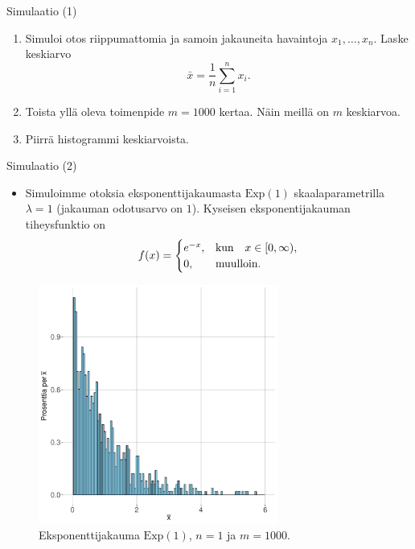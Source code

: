 \documentclass{beamer}
\begin{document}

\begin{frame}{Simulaatio (1)}
  \begin{enumerate}
    \item Simuloi otos riippumattomia ja samoin jakauneita havaintoja $x_1,
    \ldots, x_n$. Laske keskiarvo
    \begin{equation*}
      \bar x = \frac{1}{n}\sum_{i=1}^n x_i.
    \end{equation*}
    \pause
    \item Toista yllä oleva toimenpide $m = 1000$ kertaa. Näin meillä on $m$
    keskiarvoa.
    \pause
    \item Piirrä histogrammi keskiarvoista.
  \end{enumerate}
\end{frame}


\begin{frame}{Simulaatio (2)}
  \begin{itemize}
    \item Simuloimme otoksia eksponenttijakaumasta $\mathrm{Exp}(1)$
    skaalaparametrilla $\lambda = 1$ (jakauman odotusarvo on $1$). Kyseisen
    eksponentijakauman tiheysfunktio on
    \begin{equation*}
      f(x) =
      \begin{cases}
        e^{-x}, &\textnormal{kun}\quad x\in[0,\infty), \\
        0, &\textnormal{muulloin}. 
      \end{cases}
    \end{equation*}
  \end{itemize}
\end{frame}


\begin{frame}
  \begin{center}
    \begin{figure}
      \includegraphics[width=0.7\textwidth, height=0.7\textwidth]{exp-n-1.pdf}
      \caption{Eksponenttijakauma $\mathrm{Exp}\left(1\right)$, $n = 1$ ja $m = 1000$.}
  \end{figure}
\end{center}
\end{frame}
\end{document}

